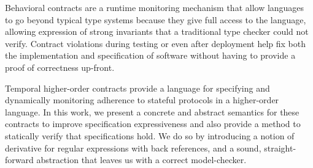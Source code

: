 Behavioral contracts are a runtime monitoring mechanism that allow languages to go beyond typical type systems because they give full access to the language, allowing expression of strong invariants that a traditional type checker could not verify.
%
Contract violations during testing or even after deployment help fix both the implementation and specification of software without having to provide a proof of correctness up-front.

Temporal higher-order contracts provide a language for specifying and dynamically monitoring adherence to stateful protocols in a higher-order language.
%
In this work, we present a concrete and abstract semantics for these contracts to improve specification expressiveness and also provide a method to statically verify that specifications hold.
%
We do so by introducing a notion of derivative for regular expressions with back references, and a sound, straight-forward abstraction that leaves us with a correct model-checker.